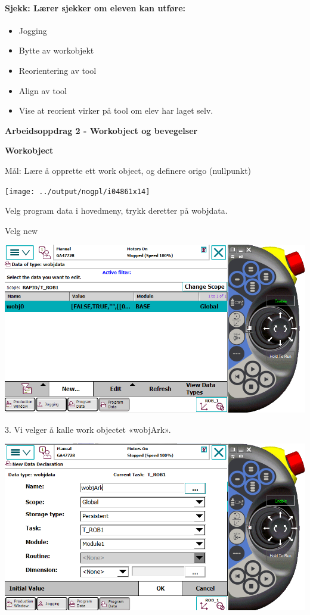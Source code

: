 \paragraph{Sjekk: Lærer sjekker om eleven kan utføre:}
\begin{itemize}
\item Jogging
\item Bytte av workobjekt
\item Reorientering av tool
\item Align av tool
\item Vise at reorient virker på tool om elev har laget selv.
\end{itemize}


\textbf{Arbeidsoppdrag 2 - Workobject og bevegelser}

\textbf{Workobject}

Mål: Lære å opprette ett work object, og definere origo (nullpunkt)

\texttt{[image: ../output/nogpl/i04861x14]}

Velg program data i hovedmeny, trykk deretter på wobjdata.

Velg new

\includegraphics[width=1\textwidth]{i04861x15}

3. Vi velger å kalle work objectet «wobjArk».

\includegraphics[width=1\textwidth]{i04861x16}

